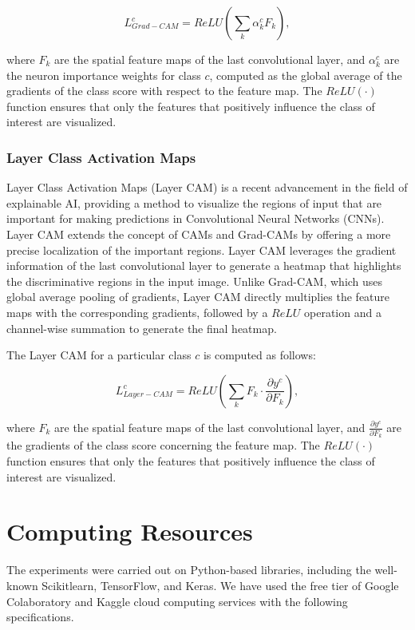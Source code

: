 \begin{equation}
    L_{Grad-CAM}^c = ReLU\left(\sum_k \alpha_k^c F_k\right),
\end{equation}

where $F_k$ are the spatial feature maps of the last convolutional layer, and $\alpha_k^c$ are the neuron importance weights for class $c$, computed as the global average of the gradients of the class score with respect to the feature map. The $ReLU(\cdot)$ function ensures that only the features that positively influence the class of interest are visualized.

\subsubsection{Layer Class Activation Maps}

Layer Class Activation Maps (Layer CAM) is a recent advancement in the field of explainable AI, providing a method to visualize the regions of input that are important for making predictions in Convolutional Neural Networks (CNNs). Layer CAM extends the concept of CAMs and Grad-CAMs by offering a more precise localization of the important regions. Layer CAM leverages the gradient information of the last convolutional layer to generate a heatmap that highlights the discriminative regions in the input image. Unlike Grad-CAM, which uses global average pooling of gradients, Layer CAM directly multiplies the feature maps with the corresponding gradients, followed by a $ReLU$ operation and a channel-wise summation to generate the final heatmap.

The Layer CAM for a particular class $c$ is computed as follows:

\begin{equation}
    L_{Layer-CAM}^c = ReLU\left(\sum_k F_k \cdot \frac{\partial y^c}{\partial F_k}\right),
\end{equation}

where $F_k$ are the spatial feature maps of the last convolutional layer, and $\frac{\partial y^c}{\partial F_k}$ are the gradients of the class score concerning the feature map. The $ReLU(\cdot)$ function ensures that only the features that positively influence the class of interest are visualized.

\section{Computing Resources}
The experiments were carried out on Python-based libraries, including the well-known Scikitlearn, TensorFlow, and Keras. We have used the free tier of Google Colaboratory and Kaggle cloud computing services with the following specifications. 

